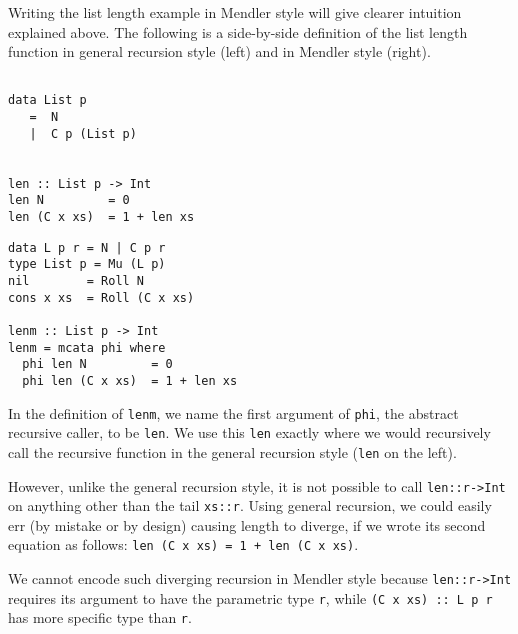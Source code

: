 Writing the list length example in Mendler style will give clearer intuition
explained above. The following is a side-by-side definition of
the list length function in general recursion style (left)
and in Mendler style (right).
\begin{center}
\begin{minipage}{.49\linewidth}
\begin{verbatim}
 
data List p
   =  N
   |  C p (List p)


len :: List p -> Int
len N         = 0
len (C x xs)  = 1 + len xs
\end{verbatim}
\end{minipage}
\begin{minipage}{.49\linewidth}
\begin{verbatim}
data L p r = N | C p r
type List p = Mu (L p)
nil        = Roll N
cons x xs  = Roll (C x xs)

lenm :: List p -> Int
lenm = mcata phi where
  phi len N         = 0
  phi len (C x xs)  = 1 + len xs
\end{verbatim}
\end{minipage}
\end{center}
In the definition of \verb|lenm|,
we name the first argument of \verb|phi|, the abstract recursive caller,
to be \verb|len|.  We use this \verb|len| exactly where we would recursively
call the recursive function in the general recursion style
(\verb|len| on the left).

However, unlike the general recursion style, it is not possible to call
\verb|len::r->Int| on anything other than the tail \verb|xs::r|.
Using general recursion, we could easily err (by mistake or by design)
causing length to diverge, if we wrote its second equation as follows:
\verb|len (C x xs) = 1 + len (C x xs)|.

We cannot encode such diverging recursion in Mendler style because
\verb|len::r->Int| requires its argument to have the parametric type \verb|r|,
while \verb|(C x xs) :: L p r| has more specific type than \verb|r|.


